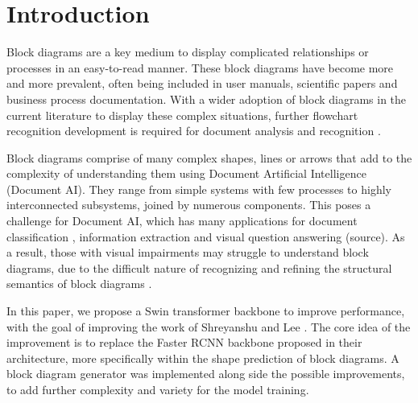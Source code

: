 \section{Introduction}



Block diagrams are a key medium to display complicated relationships or processes in an easy-to-read manner. These block diagrams have become more and more prevalent, often being included in user manuals, scientific papers and business process documentation. With a wider adoption of block diagrams in the current literature to display these complex situations, further flowchart recognition development is required for document analysis and recognition \cite{Griffiths}.

Block diagrams comprise of many complex shapes, lines or arrows that add to the complexity of understanding them using Document Artificial Intelligence (Document AI). They range from simple systems with few processes to highly interconnected subsystems, joined by numerous components. This poses a challenge for Document AI, which has many applications for document classification \cite{kang_2014_convolutional}, information extraction \cite{hwang2019postocr} and visual question answering (source). As a result, those with visual impairments may struggle to understand block diagrams, due to the difficult nature of recognizing and refining the structural semantics of block diagrams \cite{mathew_2020_docvqa}. 

In this paper, we propose a Swin transformer backbone to improve performance, with the goal of improving the work of  Shreyanshu and Lee \cite{bhushan-lee-2022-block}. The core idea of the improvement is to replace the Faster RCNN backbone proposed in their architecture, more specifically within the shape prediction of block diagrams. A block diagram generator was implemented along side the possible improvements, to add further complexity and variety for the model training. 



